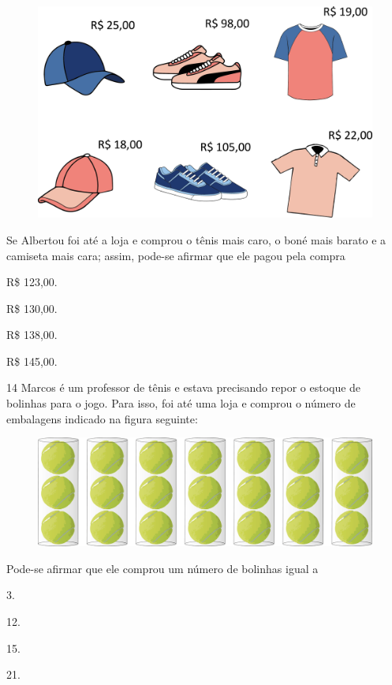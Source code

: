 \begin{figure}[htpb!]
\centering
\includegraphics[width=\textwidth]{./media/image120.png}
\end{figure}

Se Albertou foi até a loja e comprou o tênis mais caro, o boné mais barato e a camiseta mais cara; assim, pode-se afirmar que ele pagou pela compra

\begin{escolha}
\item
  R\$ 123,00.
\item
  R\$ 130,00.
\item
  R\$ 138,00.
\item
  R\$ 145,00.
\end{escolha}


\pagebreak
\num{14} Marcos é um professor de tênis e estava precisando repor o estoque de bolinhas para o jogo. Para isso, foi até uma loja e comprou o número de embalagens indicado na figura seguinte:

\begin{figure}[htpb!]
\centering
\includegraphics[width=.8\textwidth]{./media/image121.png}
\end{figure}

Pode-se afirmar que ele comprou um número de bolinhas igual a

\begin{multicols}{2}
\begin{escolha}
\item
  3.
\item
  12.
\item
  15.
\item
  21.
\end{escolha}
\end{multicols}


